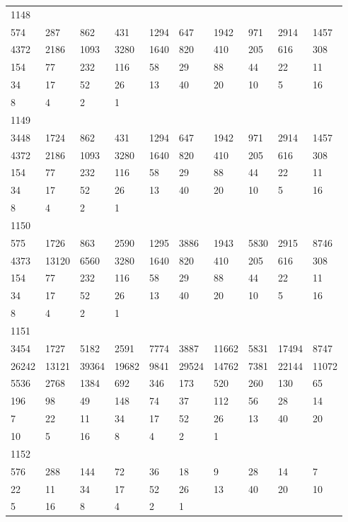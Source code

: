 \begin{longtable}{*{10}{l}}
1148&&&&&&&&&\\
574& 287& 862& 431& 1294& 647& 1942& 971& 2914& 1457\\
4372& 2186& 1093& 3280& 1640& 820& 410& 205& 616& 308\\
154& 77& 232& 116& 58& 29& 88& 44& 22& 11\\
34& 17& 52& 26& 13& 40& 20& 10& 5& 16\\
8& 4& 2& 1& \\

1149&&&&&&&&&\\
3448& 1724& 862& 431& 1294& 647& 1942& 971& 2914& 1457\\
4372& 2186& 1093& 3280& 1640& 820& 410& 205& 616& 308\\
154& 77& 232& 116& 58& 29& 88& 44& 22& 11\\
34& 17& 52& 26& 13& 40& 20& 10& 5& 16\\
8& 4& 2& 1& \\

1150&&&&&&&&&\\
575& 1726& 863& 2590& 1295& 3886& 1943& 5830& 2915& 8746\\
4373& 13120& 6560& 3280& 1640& 820& 410& 205& 616& 308\\
154& 77& 232& 116& 58& 29& 88& 44& 22& 11\\
34& 17& 52& 26& 13& 40& 20& 10& 5& 16\\
8& 4& 2& 1& \\

1151&&&&&&&&&\\
3454& 1727& 5182& 2591& 7774& 3887& 11662& 5831& 17494& 8747\\
26242& 13121& 39364& 19682& 9841& 29524& 14762& 7381& 22144& 11072\\
5536& 2768& 1384& 692& 346& 173& 520& 260& 130& 65\\
196& 98& 49& 148& 74& 37& 112& 56& 28& 14\\
7& 22& 11& 34& 17& 52& 26& 13& 40& 20\\
10& 5& 16& 8& 4& 2& 1& \\

1152&&&&&&&&&\\
576& 288& 144& 72& 36& 18& 9& 28& 14& 7\\
22& 11& 34& 17& 52& 26& 13& 40& 20& 10\\
5& 16& 8& 4& 2& 1& \\


\end{longtable}
